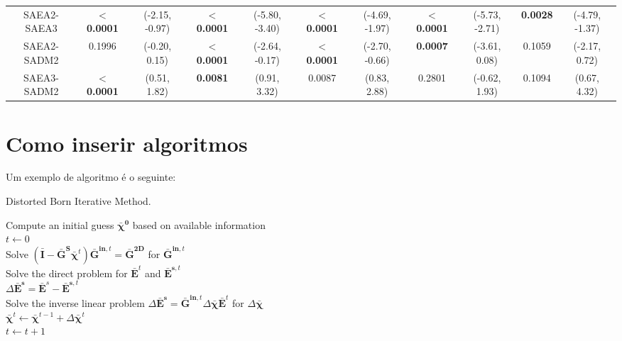 \begin{landscape}
\begin{table}[]
\begin{tabular}{ccccccccccc}
					SAEA2-SAEA3             & $\boldsymbol{<}$\textbf{0.0001} & (-2.15, -0.97) & $\boldsymbol{<}$\textbf{0.0001} & (-5.80, -3.40) & $\boldsymbol{<}$\textbf{0.0001} & (-4.69, -1.97) & $\boldsymbol{<}$\textbf{0.0001} & (-5.73, -2.71) & \textbf{0.0028} &(-4.79, -1.37)                                        \\\rowcolor{gray1}
					SAEA2-SADM2             & 0.1996                     & (-0.20, 0.15)  & $\boldsymbol{<}$\textbf{0.0001} & (-2.64, -0.17)  & $\boldsymbol{<}$\textbf{0.0001} & (-2.70, -0.66) & \textbf{0.0007}       & (-3.61, 0.08)   & 0.1059             & (-2.17, 0.72)                                        \\\rowcolor{gray2}
					SAEA3-SADM2             & $\boldsymbol{<}$\textbf{0.0001} & (0.51, 1.82)    & \textbf{0.0081}        & (0.91, 3.32)     & 0.0087                       & (0.83, 2.88)   & 0.2801                    & (-0.62, 1.93)   & 0.1094             & (0.67, 4.32)                                                         
				\end{tabular}
				\label{tab:results:benchmark:zetas:pvalues}
			\end{table}
		\end{landscape}
	
	\chapter{Como inserir algoritmos}

		Um exemplo de algoritmo é o seguinte:
		\begin{algorithm}[!htb]
			\caption{Distorted Born Iterative Method.}
			\label{alg:dbim}
			Compute an initial guess $\boldsymbol{\bar{\chi}^0}$ based on available information \\
			$t\leftarrow0$ \\
			 {
				Solve $\left(\mathbf{\bar{I}} - \mathbf{\bar{G}^S}\boldsymbol{\bar{\chi}}^t\right)\mathbf{\bar{G}}^{\mathbf{in},t} = \mathbf{\bar{G}^{2D}}$ for $\mathbf{\bar{G}}^{\mathbf{in},t}$ \\
				Solve the direct problem for $\mathbf{\bar{E}}^t$ and $\mathbf{\bar{E}}^{\mathbf{s},t}$ \\
				$\Delta\mathbf{\bar{E}^s} = \mathbf{\bar{E}}^s - \mathbf{\bar{E}}^{\mathbf{s},t}$ \\
				Solve the inverse linear problem $\Delta\mathbf{\bar{E}^s} = \mathbf{\bar{G}}^{\mathbf{in},t}\Delta\boldsymbol{\bar{\chi}}\mathbf{\bar{E}}^t$ for $\Delta\boldsymbol{\bar{\chi}}$\\
				$\boldsymbol{\bar{\chi}}^t \leftarrow \boldsymbol{\bar{\chi}}^{t-1} + \Delta\boldsymbol{\bar{\chi}}^t$ \\
				$t\leftarrow t+1$\\
			}
		\end{algorithm}
	
